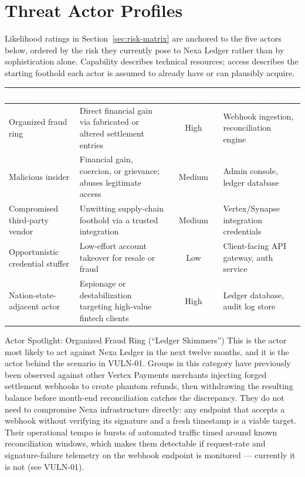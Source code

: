 \section{Threat Actor Profiles}
\label{sec:threat-actors}

Likelihood ratings in Section~\ref{sec:risk-matrix} are anchored to the five actors below, ordered by the risk they currently pose to Nexa Ledger rather than by sophistication alone. Capability describes technical resources; access describes the starting foothold each actor is assumed to already have or can plausibly acquire.

\begin{center}
\begin{tabularx}{\linewidth}{@{}l L c L@{}}
\toprule
{}
\textcolor{white}{\textbf{Actor}} & \textcolor{white}{\textbf{Motivation}} & \textcolor{white}{\textbf{Capability}} & \textcolor{white}{\textbf{Primary Target}} \\
\midrule
Organized fraud ring & Direct financial gain via fabricated or altered settlement entries & High & Webhook ingestion, reconciliation engine \\
Malicious insider & Financial gain, coercion, or grievance; abuses legitimate access & Medium & Admin console, ledger database \\
Compromised third-party vendor & Unwitting supply-chain foothold via a trusted integration & Medium & Vertex/Synapse integration credentials \\
Opportunistic credential stuffer & Low-effort account takeover for resale or fraud & Low & Client-facing API gateway, auth service \\
Nation-state-adjacent actor & Espionage or destabilization targeting high-value fintech clients & High & Ledger database, audit log store \\
\bottomrule
\end{tabularx}
\end{center}

\begin{warningbox}{Actor Spotlight: Organized Fraud Ring (``Ledger Skimmers'')}
This is the actor most likely to act against Nexa Ledger in the next twelve months, and it is the actor behind the scenario in VULN-01. Groups in this category have previously been observed against other Vertex Payments merchants injecting forged settlement webhooks to create phantom refunds, then withdrawing the resulting balance before month-end reconciliation catches the discrepancy. They do not need to compromise Nexa infrastructure directly: any endpoint that accepts a webhook without verifying its signature and a fresh timestamp is a viable target. Their operational tempo is bursts of automated traffic timed around known reconciliation windows, which makes them detectable if request-rate and signature-failure telemetry on the webhook endpoint is monitored --- currently it is not (see VULN-01).
\end{warningbox}


